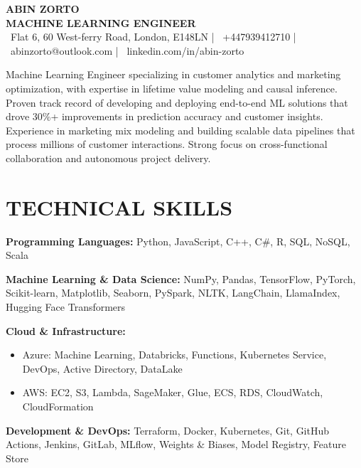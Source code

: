 \documentclass[10pt,a4paper]{article}
\begin{document}

\begin{center}
    {\color{primary}\Large\textbf{ABIN ZORTO}}\\[0.2em]
    {\color{secondary}\large\textbf{MACHINE LEARNING ENGINEER}}\\[0.3em]
    
    \small\color{secondary}
    \faMapMarker\ Flat 6, 60 West-ferry Road, London, E148LN |
    \faMobile\ +447939412710 |
    \faEnvelope\ abinzorto@outlook.com |
    \faLinkedin\ linkedin.com/in/abin-zorto
\end{center}

{\color{secondary}
Machine Learning Engineer specializing in customer analytics and marketing optimization, with expertise in lifetime value modeling and causal inference. Proven track record of developing and deploying end-to-end ML solutions that drove 30\%+ improvements in prediction accuracy and customer insights. Experience in marketing mix modeling and building scalable data pipelines that process millions of customer interactions. Strong focus on cross-functional collaboration and autonomous project delivery.
}

\section*{TECHNICAL SKILLS}
\textbf{Programming Languages:} Python, JavaScript, C++, C\#, R, SQL, NoSQL, Scala

\textbf{Machine Learning \& Data Science:} NumPy, Pandas, TensorFlow, PyTorch, Scikit-learn, Matplotlib, Seaborn, PySpark, NLTK, LangChain, LlamaIndex, Hugging Face Transformers

\textbf{Cloud \& Infrastructure:}
\begin{itemize}
    \item Azure: Machine Learning, Databricks, Functions, Kubernetes Service, DevOps, Active Directory, DataLake
    \item AWS: EC2, S3, Lambda, SageMaker, Glue, ECS, RDS, CloudWatch, CloudFormation
\end{itemize}

\textbf{Development \& DevOps:} Terraform, Docker, Kubernetes, Git, GitHub Actions, Jenkins, GitLab, MLflow, Weights \& Biases, Model Registry, Feature Store
\end{document}
